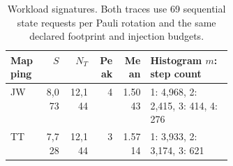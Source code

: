 \begin{table}[htbp]
\centering\small
\begin{tabular}{lrrrrp{0.37\linewidth}}
\toprule
Mapping & $S$ & $N_T$ & Peak & Mean & Histogram $m$: step count\\\midrule
JW & 8,073 & 12,144 & 4 & 1.5043 & 1: 4,968, 2: 2,415, 3: 414, 4: 276\\
TT & 7,728 & 12,144 & 3 & 1.5714 & 1: 3,933, 2: 3,174, 3: 621\\
\bottomrule
\end{tabular}
\caption{Workload signatures. Both traces use 69 sequential state requests per Pauli rotation and the same declared footprint and injection budgets.}
\label{tab:workloads}
\end{table}
